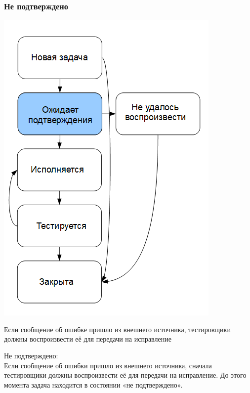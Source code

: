 \documentclass{../industrial-development}
\begin{document}
\begin{frame} \frametitle{Не подтверждено}
\begin{minipage}{0.49\textwidth}
  \begin{flushleft}
		\includegraphics[height=0.8\textheight]{cyc7.png}
  \end{flushleft}
\end{minipage}
\begin{minipage}{0.5\textwidth}
  \begin{flushright}
		\begin{block}{}
		Если сообщение об ошибке пришло из внешнего источника, тестировщики должны воспроизвести её для передачи на исправление
		\end{block}
  \end{flushright}
\end{minipage}
\end{frame}
\lecturenotes
Не подтверждено:\\
Если сообщение об ошибки пришло из внешнего источника, сначала тестировщики должны воспроизвести её для передачи на исправление. До этого момента задача находится в состоянии «не подтверждено».
		
\end{document}
